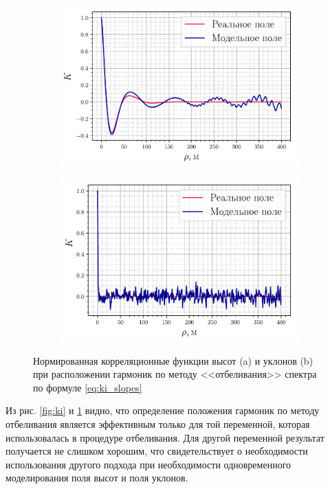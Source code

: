 \begin{figure}[h!]
    \centering
    \begin{subfigure}{0.49\linewidth}
        \centering
        \includegraphics[width=\linewidth]{fig/correlation_height_slopes2.pdf}
        \caption{}
    \end{subfigure}
    \begin{subfigure}{0.49\linewidth}
        \centering
        \includegraphics[width=\linewidth]{fig/correlation_angles_slopes2.pdf}
        \caption{}
    \end{subfigure}
    \caption{Нормированная корреляционные функции высот (a) и уклонов (b) при расположении гармоник
    по методу <<отбеливания>> спектра по формуле \eqref{eq:ki_slopes} }
    \label{fig:ki_slopes}
\end{figure}

Из рис. \ref{fig:ki} и \ref{fig:ki_slopes} видно, что определение положения
гармоник по методу отбеливания является эффективным только для той переменной,
которая использовалась в процедуре отбеливания. Для другой переменной результат
получается не слишком хорошим, что свидетельствует о необходимости
использования другого подхода при необходимости одновременного моделирования
поля высот и поля уклонов.

